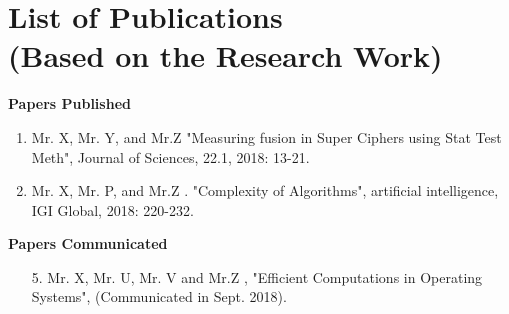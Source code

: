 \documentclass[a4paper, 12pt]{report}
\theoremstyle{definition}
\begin{document}
\chapter*{List of Publications \\ \large(Based on the Research Work)}
\textbf{\Large Papers Published}
\begin{enumerate}
	\item Mr. X, Mr. Y, and Mr.Z "Measuring fusion in Super Ciphers using Stat Test Meth", Journal of Sciences, 22.1, 2018: 13-21.
	\item Mr. X, Mr. P, and Mr.Z . "Complexity of Algorithms", artificial intelligence, IGI Global, 2018: 220-232.
	
\end{enumerate}\vspace{0.4cm}

\noindent \textbf{\Large Papers Communicated}
\begin{enumerate}
	\item [5.] Mr. X, Mr. U, Mr. V and Mr.Z , "Efficient Computations in Operating Systems", (Communicated in Sept. 2018).
\end{enumerate}
\end{document}
